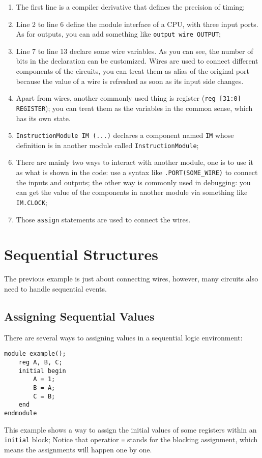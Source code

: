 \begin{enumerate}
	\item The first line is a compiler derivative that defines the precision of timing;
	\item Line 2 to line 6 define the module interface of a CPU, with three input ports. As for outputs, you can add something like \texttt{output wire OUTPUT};
	\item Line 7 to line 13 declare some wire variables. As you can see, the number of bits in the declaration can be customized. Wires are used to connect different components of the circuits, you can treat them as alias of the original port because the value of a wire is refreshed as soon as its input side changes.
	\item Apart from wires, another commonly used thing is register (\texttt{reg [31:0] REGISTER}); you can treat them as the variables in the common sense, which has its own state.
	\item \texttt{InstructionModule IM (...)} declares a component named \texttt{IM} whose definition is in another module called \texttt{InstructionModule};
	\item There are mainly two ways to interact with another module, one is to use it as what is shown in the code: use a syntax like \texttt{.PORT(SOME_WIRE)} to connect the inputs and outputs; the other way is commonly used in debugging: you can get the value of the components in another module via something like \texttt{IM.CLOCK};
	\item Those \texttt{assign} statements are used to connect the wires.
\end{enumerate}
\section{Sequential Structures}
The previous example is just about connecting wires, however, many circuits also need to handle sequential events.
\subsection{Assigning Sequential Values}
There are several ways to assigning values in a sequential logic environment:
\begin{verbatim}
module example();
    reg A, B, C;
    initial begin
        A = 1;
        B = A;
        C = B;
    end
endmodule
\end{verbatim}
This example shows a way to assign the initial values of some registers within an \texttt{initial} block; Notice that operatior \texttt{=} stands for the blocking assignment, which means the assignments will happen one by one.

